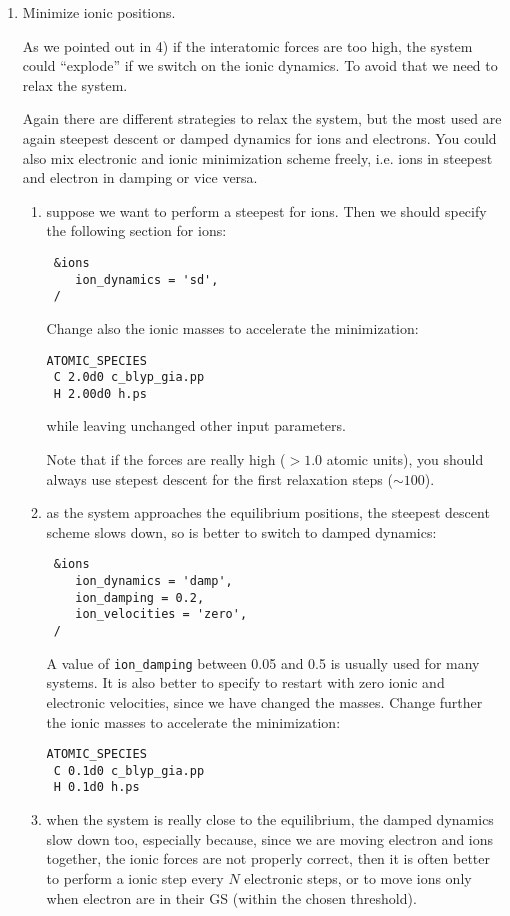 \documentclass[12pt,a4paper]{article}
\begin{document}
\begin{enumerate}
  \item
    Minimize ionic positions.

    As we pointed out in 4) if the interatomic forces are too high,
    the system could ``explode'' if we switch on the ionic dynamics.
    To avoid that we need to relax the system. 

    Again there are different strategies to relax the system, but the
    most used are again steepest descent or damped dynamics for ions
    and electrons.
    You could also mix electronic and ionic minimization scheme
    freely, i.e. ions in steepest and electron in damping or vice
    versa.
   
    \begin{enumerate}
      \item
        suppose we want to perform a steepest for ions.
        Then we should specify the following section for ions:
\begin{verbatim}
 &ions
    ion_dynamics = 'sd',
 /
\end{verbatim}
        Change also the ionic masses to accelerate the minimization:
\begin{verbatim}
ATOMIC_SPECIES
 C 2.0d0 c_blyp_gia.pp
 H 2.00d0 h.ps
\end{verbatim}
        while leaving unchanged other input parameters.   

        Note that if the forces are really high ($> 1.0$ atomic
        units), you should always use stepest descent for the first
        relaxation steps ($\sim 100$).
   
      \item
        as the system approaches the equilibrium positions, the
        steepest descent scheme slows down, so is better to switch to
        damped dynamics:
\begin{verbatim}
 &ions
    ion_dynamics = 'damp',
    ion_damping = 0.2,
    ion_velocities = 'zero',
 /
\end{verbatim}
        A value of \texttt{ion\_damping} between 0.05 and 0.5 is
        usually used for many systems.
        It is also better to specify to restart with zero ionic and
        electronic velocities, since we have changed the masses.
        Change further the ionic masses to accelerate the
        minimization:
\begin{verbatim}
ATOMIC_SPECIES
 C 0.1d0 c_blyp_gia.pp
 H 0.1d0 h.ps
\end{verbatim}

      \item
        when the system is really close to the equilibrium, the damped
        dynamics slow down too, especially because, since we are
        moving electron and ions together, the ionic forces are not
        properly correct, then it is often better to perform a ionic
        step every $N$ electronic steps, or to move ions only when
        electron are in their GS (within the chosen threshold).


\end{enumerate}
\end{enumerate}
\end{document}

